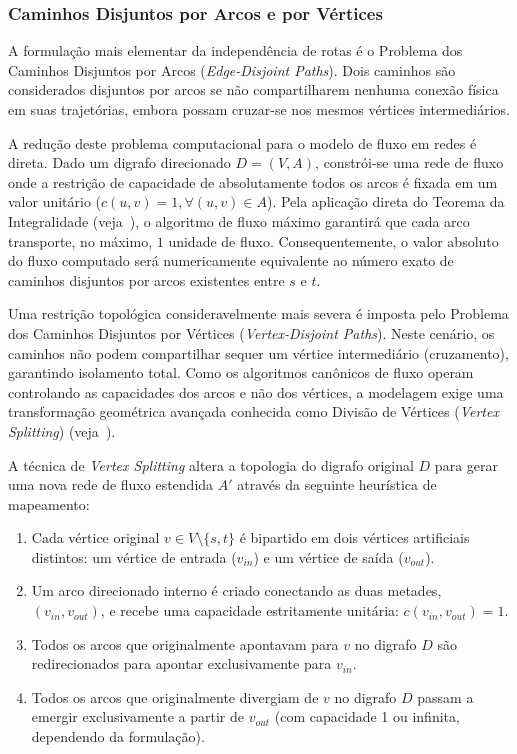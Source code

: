\documentclass[12pt,a4paper]{article}
\begin{document}
\begin{enumerate}
\subsubsection{Caminhos Disjuntos por Arcos e por Vértices}

A formulação mais elementar da independência de rotas é o Problema dos Caminhos Disjuntos por Arcos (\textit{Edge-Disjoint Paths}). Dois caminhos são considerados disjuntos por arcos se não compartilharem nenhuma conexão física em suas trajetórias, embora possam cruzar-se nos mesmos vértices intermediários.

A redução deste problema computacional para o modelo de fluxo em redes é direta. Dado um digrafo direcionado $D = (V, A)$, constrói-se uma rede de fluxo onde a restrição de capacidade de absolutamente todos os arcos é fixada em um valor unitário ($c(u,v) = 1, \forall (u,v) \in A$). Pela aplicação direta do Teorema da Integralidade (veja~\cite{cook1998combinatorial}), o algoritmo de fluxo máximo garantirá que cada arco transporte, no máximo, $1$ unidade de fluxo. Consequentemente, o valor absoluto do fluxo computado será numericamente equivalente ao número exato de caminhos disjuntos por arcos existentes entre $s$ e $t$.

Uma restrição topológica consideravelmente mais severa é imposta pelo Problema dos Caminhos Disjuntos por Vértices (\textit{Vertex-Disjoint Paths}). Neste cenário, os caminhos não podem compartilhar sequer um vértice intermediário (cruzamento), garantindo isolamento total. Como os algoritmos canônicos de fluxo operam controlando as capacidades dos arcos e não dos vértices, a modelagem exige uma transformação geométrica avançada conhecida como Divisão de Vértices (\textit{Vertex Splitting}) (veja~\cite{ahuja1993network}).

A técnica de \textit{Vertex Splitting} altera a topologia do digrafo original $D$ para gerar uma nova rede de fluxo estendida $A'$ através da seguinte heurística de mapeamento:
\begin{enumerate}
    \item Cada vértice original $v \in V \setminus \{s, t\}$ é bipartido em dois vértices artificiais distintos: um vértice de entrada ($v_{in}$) e um vértice de saída ($v_{out}$).
    \item Um arco direcionado interno é criado conectando as duas metades, $(v_{in}, v_{out})$, e recebe uma capacidade estritamente unitária: $c(v_{in}, v_{out}) = 1$.
    \item Todos os arcos que originalmente apontavam para $v$ no digrafo $D$ são redirecionados para apontar exclusivamente para $v_{in}$.
    \item Todos os arcos que originalmente divergiam de $v$ no digrafo $D$ passam a emergir exclusivamente a partir de $v_{out}$ (com capacidade 1 ou infinita, dependendo da formulação).
\end{enumerate}


\end{enumerate}
\end{document}
